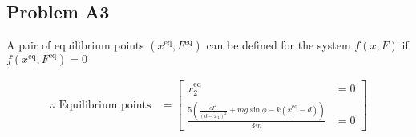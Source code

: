 \subsection*{Problem A3}
    A pair of equilibrium points $({x^\text{eq}}, {F^\text{eq}})$ can be defined for the system $f(x, F)$ if $f({x^\text{eq}}, {F^\text{eq}}) = 0$
    
    \begin{align}
        {\therefore} \text{ Equilibrium points} &=
        \begin{bmatrix}
            {x_2^\text{eq}} &= 0
            \\
            \frac{5(\frac{c I^2}{(d - {x_1})^2} + mg \sin{\phi} - k({x_1^\text{eq}} -d))}{3m} &= 0
        \end{bmatrix}
    \end{align}
    